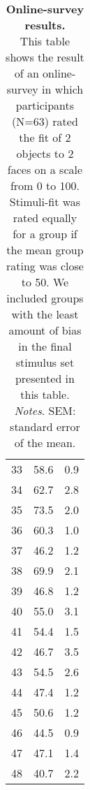 \begin{fullwidth}
\begin{table}[!ht]
\begin{tabular}{c|c|c}
        33 & 58.6 & 0.9 \\
        34 & 62.7 & 2.8 \\
        35 & 73.5 & 2.0 \\
        36 & 60.3 & 1.0 \\
        37 & 46.2 & 1.2 \\
        38 & 69.9 & 2.1 \\
        39 & 46.8 & 1.2 \\
        40 & 55.0 & 3.1 \\
        41 & 54.4 & 1.5 \\
        42 & 46.7 & 3.5 \\
        43 & 54.5 & 2.6 \\
        44 & 47.4 & 1.2 \\
        45 & 50.6 & 1.2 \\
        46 & 44.5 & 0.9 \\
        47 & 47.1 & 1.4 \\
        48 & 40.7 & 2.2 \\
    \end{tabular}
    \vspace{1.0 em}
    \caption{\textbf{Online-survey results.} \\ This table shows the result of an online-survey in which participants (N=63) rated the fit of 2 objects to 2 faces on a scale from 0 to 100. Stimuli-fit was rated equally for a group if the mean group rating was close to 50. We included groups with the least amount of bias in the final stimulus set presented in this table.\\ \vspace{1.0 em} \textit{Notes}. SEM: standard error of the mean.}
    \label{tab:Label}
\end{table}
\end{fullwidth}
